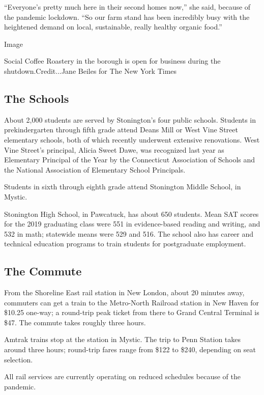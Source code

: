 ``Everyone's pretty much here in their second homes now,'' she said,
because of the pandemic lockdown. ``So our farm stand has been
incredibly busy with the heightened demand on local, sustainable, really
healthy organic food.''

Image

Social Coffee Roastery in the borough is open for business during the
shutdown.Credit...Jane Beiles for The New York Times

\hypertarget{the-schools}{%
\subsection{The Schools}\label{the-schools}}

About 2,000 students are served by Stonington's four public schools.
Students in prekindergarten through fifth grade attend Deans Mill or
West Vine Street elementary schools, both of which recently underwent
extensive renovations. West Vine Street's principal, Alicia Sweet Dawe,
was recognized last year as Elementary Principal of the Year by the
Connecticut Association of Schools and the National Association of
Elementary School Principals.

Students in sixth through eighth grade attend Stonington Middle School,
in Mystic.

Stonington High School, in Pawcatuck, has about 650 students. Mean SAT
scores for the 2019 graduating class were 551 in evidence-based reading
and writing, and 532 in math; statewide means were 529 and 516. The
school also has career and technical education programs to train
students for postgraduate employment.

\hypertarget{the-commute}{%
\subsection{The Commute}\label{the-commute}}

From the Shoreline East rail station in New London, about 20 minutes
away, commuters can get a train to the Metro-North Railroad station in
New Haven for \$10.25 one-way; a round-trip peak ticket from there to
Grand Central Terminal is \$47. The commute takes roughly three hours.

Amtrak trains stop at the station in Mystic. The trip to Penn Station
takes around three hours; round-trip fares range from \$122 to \$240,
depending on seat selection.

All rail services are currently operating on reduced schedules because
of the pandemic.

